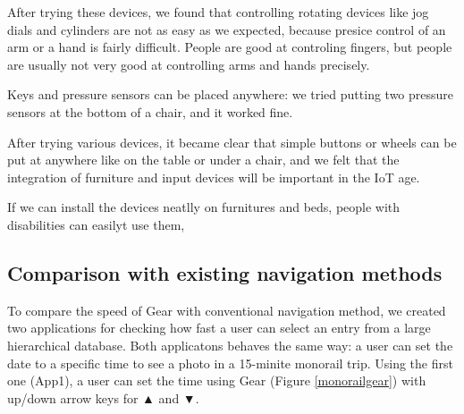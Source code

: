 \documentclass[conference]{IEEEtran}
\def\up{▲}
\def\down{▼}
\begin{document}
After trying these devices, we found that controlling rotating devices
like jog dials and cylinders are not as easy as we expected,
because presice control of an arm or a hand is fairly difficult.
People are good at controling fingers, but people are usually not very good at
controlling arms and hands precisely.

Keys and pressure sensors can be placed anywhere:
we tried putting two pressure sensors at the bottom of a chair, and it worked fine.


After trying various devices, it became clear that simple buttons or
wheels can be put at anywhere like on the table or under a chair, and
we felt that the integration of furniture and input devices will be
important in the IoT age.

If we can install the devices neatlly on furnitures and beds, people with disabilities can easilyt use them, 

\subsection{Comparison with existing navigation methods}

To compare the speed of Gear with conventional navigation method,
we created two applications for checking how fast a user can select an entry
from a large hierarchical database.
%
Both applicatons behaves the same way:
a user can set the date to a specific time to see a photo in a 15-minite monorail trip.
%
Using the first one (App1), a user can set the time using Gear (Figure \ref{monorailgear})
with up/down arrow keys for {\up} and {\down}.
\end{document}
